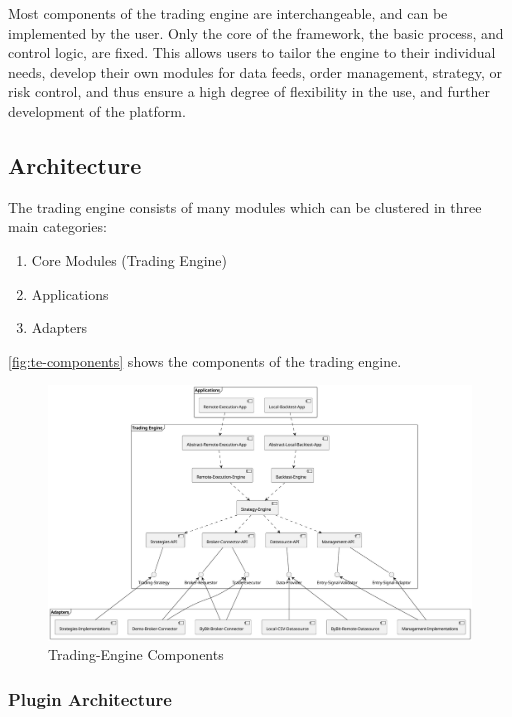 Most components of the trading engine are interchangeable, and can be implemented by the user.
Only the core of the framework, the basic process, and control logic, are fixed.
This allows users to tailor the engine to their individual needs, develop their own modules for data feeds, order management, strategy, or risk control, and thus ensure a high degree of flexibility in the use, and further development of the platform.

\subsection{Architecture}

The trading engine consists of many modules which can be clustered in three main categories:

\begin{enumerate}
    \item Core Modules (Trading Engine)
    \item Applications
    \item Adapters
\end{enumerate}

\autoref{fig:te-components} shows the components of the trading engine.

\begin{figure}[H]
    \centering
    \includegraphics[width=\textwidth]{images/trading-engine/trading-engine-components.pdf}
    \caption{Trading-Engine Components}
    \label{fig:te-components}
\end{figure}

\subsubsection{Plugin Architecture}

